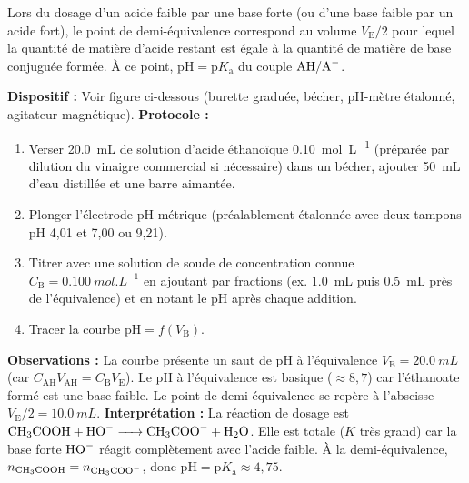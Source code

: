 \documentclass[11pt]{article}
\begin{document}
\begin{definition}
Lors du dosage d'un acide faible par une base forte (ou d'une base faible par un acide fort), le point de demi-équivalence correspond au volume $V_{\text{E}}/2$ pour lequel la quantité de matière d'acide restant est égale à la quantité de matière de base conjuguée formée. À ce point, $\mathrm{pH} = \mathrm{p}K_\mathrm{a}$ du couple $\ce{AH}/\ce{A-}$.
\end{definition}

\begin{experience}
\textbf{Dispositif :} Voir figure ci-dessous (burette graduée, bécher, pH-mètre étalonné, agitateur magnétique).
\textbf{Protocole :}
\begin{enumerate}
\item Verser \SI{20,0}{mL} de solution d'acide éthanoïque \SI{0,10}{mol.L^{-1}} (préparée par dilution du vinaigre commercial si nécessaire) dans un bécher, ajouter \SI{50}{mL} d'eau distillée et une barre aimantée.
\item Plonger l'électrode pH-métrique (préalablement étalonnée avec deux tampons pH 4,01 et 7,00 ou 9,21).
\item Titrer avec une solution de soude de concentration connue $C_\text{B} = \SI{0,100}{mol.L^{-1}}$ en ajoutant par fractions (ex. \SI{1,0}{mL} puis \SI{0,5}{mL} près de l'équivalence) et en notant le pH après chaque addition.
\item Tracer la courbe $\mathrm{pH} = f(V_\text{B})$.
\end{enumerate}
\textbf{Observations :} La courbe présente un saut de pH à l'équivalence $V_\text{E} = \SI{20,0}{mL}$ (car $C_\text{AH}V_\text{AH} = C_\text{B}V_\text{E}$). Le pH à l'équivalence est basique ($\approx 8,7$) car l'éthanoate formé est une base faible. Le point de demi-équivalence se repère à l'abscisse $V_\text{E}/2 = \SI{10,0}{mL}$.
\textbf{Interprétation :} La réaction de dosage est $\ce{CH3COOH + HO- -> CH3COO- + H2O}$. Elle est totale ($K$ très grand) car la base forte $\ce{HO-}$ réagit complètement avec l'acide faible. À la demi-équivalence, $n_{\ce{CH3COOH}} = n_{\ce{CH3COO-}}$, donc $\mathrm{pH} = \mathrm{p}K_\mathrm{a} \approx 4,75$.
\end{experience}
\end{document}
